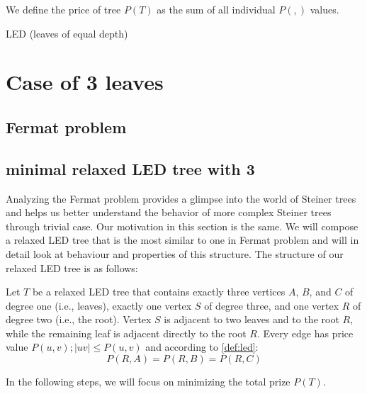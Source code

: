 \documentclass[12pt]{article}
\newcommand{\Price}[2]{P(#1,#2)}
\newcommand{\Ptotal}[1]{P(#1)}
\begin{document}
		We define the price of tree \(\Ptotal{T}\) as the sum of all individual \(\Price{}{}\) values.
	
	LED (leaves of equal depth)

	
	
	\maketitle

	\section*{Case of 3 leaves}
	
	
	 
	\subsection{Fermat problem}
	
	
	
	\subsection{minimal relaxed LED tree with 3}
	
	Analyzing the Fermat problem provides a glimpse into the world of Steiner trees and helps us better understand the behavior of more complex Steiner trees through trivial case. Our motivation in this section is the same. We will compose a relaxed LED tree that is the most similar to one in Fermat problem and will in detail look at behaviour and properties of this structure. The structure of our relaxed LED tree is as follows:
	
	Let \( T \) be a relaxed LED tree that contains exactly three vertices \( A \), \( B \), and \( C \) of degree one (i.e., leaves), exactly one vertex \( S \) of degree three, and one vertex \( R \) of degree two (i.e., the root). Vertex \( S \) is adjacent to two leaves and to the root \( R \), while the remaining leaf is adjacent directly to the root \( R \). Every edge has price value \(\Price{u}{v}; |uv| \leq \Price{u}{v} \) and according to \cref{def:led}: 
	\[
	\Price{R}{A} = \Price{R}{B} = \Price{R}{C}
	\] 
	
	In the following steps, we will focus on minimizing the total prize \(\Ptotal{T}\).
	
	
	
\end{document}
